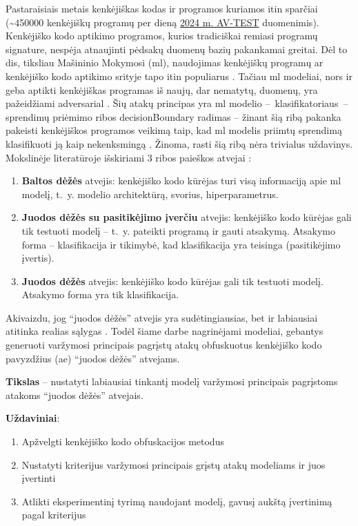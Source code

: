
Pastaraisiais metais kenkėjiškas kodas ir programos kuriamos itin sparčiai (\sim450000 kenkėjiškų programų per dieną \href{https://www.av-test.org/en/statistics/malware/}{2024 m. AV-TEST} duomenimis). Kenkėjiško kodo aptikimo programos, kurios tradiciškai remiasi programų \gls{signature}, nespėja atnaujinti pėdsakų duomenų bazių pakankamai greitai. Dėl to \acfp{di}, tiksliau Mašininio Mokymosi (\acs{ml}), naudojimas kenkėjiškų programų ar kenkėjiško kodo aptikimo srityje tapo itin populiarus \cite{demetrioAdversarialEXEmplesSurvey2021}. Tačiau \ac{ml} modeliai, nors ir geba aptikti kenkėjiškas programas iš naujų, dar nematytų, duomenų, yra pažeidžiami \gls{adversarial} \cite{castroAIMEDEvolvingMalware2019,huGeneratingAdversarialMalware2017,rosenbergGenericBlackBoxEndEnd2018,zhongReinforcementLearningBased2022}. Šių atakų principas yra \ac{ml} modelio --~klasifikatoriaus~-- sprendimų priėmimo ribos \gls{decisionBoundary} radimas -- žinant šią ribą pakanka pakeisti kenkėjiškos programos veikimą taip, kad \ac{ml} modelis priimtų sprendimą klasifikuoti ją kaip nekenksmingą \cite{demetrioAdversarialEXEmplesSurvey2021}. Žinoma, rasti šią ribą nėra trivialus uždavinys. Mokslinėje literatūroje išskiriami 3 ribos paieškos atvejai \cite{fangEvadingMalwareEngines2019}:
\begin{enumerate}
    \item \textbf{Baltos dėžės} atvejis: kenkėjiško kodo kūrėjas turi visą informaciją apie \ac{ml} modelį, t.~y. modelio architektūrą, svorius, hiperparametrus.
    \item \textbf{Juodos dėžės su pasitikėjimo įverčiu} atvejis: kenkėjiško kodo kūrėjas gali tik testuoti modelį -- t.~y. pateikti programą ir gauti atsakymą. Atsakymo forma -- klasifikacija ir tikimybė, kad klasifikacija yra teisinga (pasitikėjimo įvertis).
    \item \textbf{Juodos dėžės} atvejis: kenkėjiško kodo kūrėjas gali tik testuoti modelį. Atsakymo forma yra tik klasifikacija.
\end{enumerate}
Akivaizdu, jog \enquote{juodos dėžės} atvejis yra sudėtingiausias, bet ir labiausiai atitinka realias sąlygas \citeplace. Todėl šiame darbe nagrinėjami modeliai, gebantys generuoti varžymosi principais pagrįstų atakų obfuskuotus kenkėjiško kodo pavyzdžius (\acs{ae}) \enquote{juodos dėžės} atvejams.

\vspace{10pt}
\textbf{Tikslas} -- nustatyti labiausiai tinkantį modelį varžymosi principais pagrįstoms atakoms \enquote{juodos dėžės} atvejais.

\vspace{10pt}
\textbf{Uždaviniai}:
\begin{enumerate}
    \item Apžvelgti kenkėjiško kodo obfuskacijos metodus
    \item Nustatyti kriterijus varžymosi principais grįstų atakų modeliams ir juos įvertinti
    \item Atlikti eksperimentinį tyrimą naudojant modelį, gavusį aukštą įvertinimą pagal kriterijus
\end{enumerate}